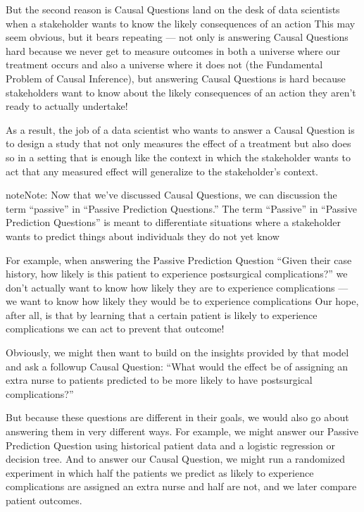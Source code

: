 \documentclass[letterpaper,10pt,english]{jupyterBook}
\begin{document}
\sphinxAtStartPar
But the second reason is Causal Questions land on the desk of data scientists when a stakeholder wants to know the likely consequences of an action  This may seem obvious, but it bears repeating — not only is answering Causal Questions hard because we never get to measure outcomes in both a universe where our treatment occurs and also a universe where it does not (the Fundamental Problem of Causal Inference), but answering Causal Questions is  hard because stakeholders want to know about the likely consequences of an action they aren’t ready to actually undertake!

\sphinxAtStartPar
As a result, the job of a data scientist who wants to answer a Causal Question is to design a study that not only measures the effect of a treatment but also does so in a setting that is enough like the context in which the stakeholder wants to act that any measured effect will generalize to the stakeholder’s context.

\begin{sphinxadmonition}{note}{Note:}
\sphinxAtStartPar
Now that we’ve discussed Causal Questions, we can discussion the term “passive” in “Passive Prediction Questions.” The term “Passive” in “Passive Prediction Questions” is meant to differentiate situations where a stakeholder wants to predict things about individuals they do not yet know 

\sphinxAtStartPar
For example, when answering the Passive Prediction Question “Given their case history, how likely is this patient to experience post\sphinxhyphen{}surgical complications?” we don’t actually want to know how likely they are to experience complications — we want to know how likely they would be to experience complications  Our hope, after all, is that by learning that a certain patient is likely to experience complications we can act to prevent that outcome!

\sphinxAtStartPar
Obviously, we might then want to build on the insights provided by that model and ask a followup Causal Question: “What would the effect be of assigning an extra nurse to patients predicted to be more likely to have post\sphinxhyphen{}surgical complications?”

\sphinxAtStartPar
But because these questions are different in their goals, we would also go about answering them in very different ways. For example, we might answer our Passive Prediction Question using historical patient data and a logistic regression or decision tree. And to answer our Causal Question, we might run a randomized experiment in which half the patients we predict as likely to experience complications are assigned an extra nurse and half are not, and we later compare patient outcomes.
\end{sphinxadmonition}
\end{document}

